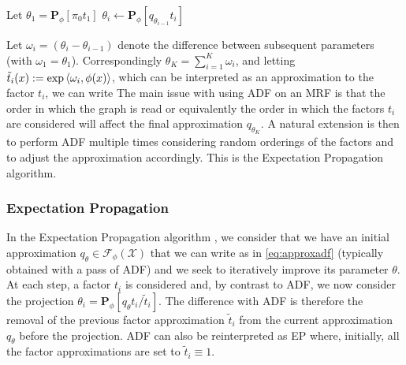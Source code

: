 \begin{algorithm}[!h]\small
	\caption{\label{alg:adf}}
	\begin{algorithmic}[1]
	\State Let $\theta_{1}=\mathbf P_{\phi}[\pi_{0}t_{1}]$
		\State $\theta_{i}\leftarrow\mathbf P_{\phi}[q_{\theta_{i-1}}t_{i}]$ 
	\EndFor\\
	\end{algorithmic}
\end{algorithm} 

Let $\omega_{i}=(\theta_{i}-\theta_{i-1})$ denote the difference between subsequent parameters (with $\omega_{1}=\theta_{1}$). Correspondingly $\theta_{K}=\sum_{i=1}^{K}\omega_{i}$, and letting $\tilde t_{i}(x):=\exp\left\langle \omega_{i},\phi(x) \right\rangle$, which can be interpreted as an approximation to the factor $t_{i}$, we can write 
%
% 
The main issue with using ADF on an MRF is that the order in which the graph is read or equivalently the order in which the factors $t_{i}$ are considered will affect the final approximation $q_{\theta_{K}}$. A natural extension is then to perform ADF multiple times considering random orderings of the factors and to adjust the approximation accordingly. This is the Expectation Propagation algorithm.
%
\subsubsection*{Expectation Propagation}
%
In the Expectation Propagation algorithm \citep{minka01, minka01b, seeger07, gelman14}, we consider that we have an initial approximation $q_{\theta}\in\mathcal F_{\phi}(\mathcal X)$ that we can write as in \eqref{eq:approxadf} (typically obtained with a pass of ADF) and we seek to iteratively improve its parameter $\theta$. At each step, a factor $t_{i}$ is considered and, by contrast to ADF, we now consider the projection $\theta_{i}=\mathbf P_{\phi}[q_{\theta}t_{i}/\tilde t_{i}]$. The difference with ADF is therefore the removal of the previous factor approximation $\tilde t_{i}$ from the current approximation $q_{\theta}$ before the projection. ADF can also be reinterpreted as EP where, initially, all the factor approximations are set to $\tilde t_{i}\equiv 1$.


